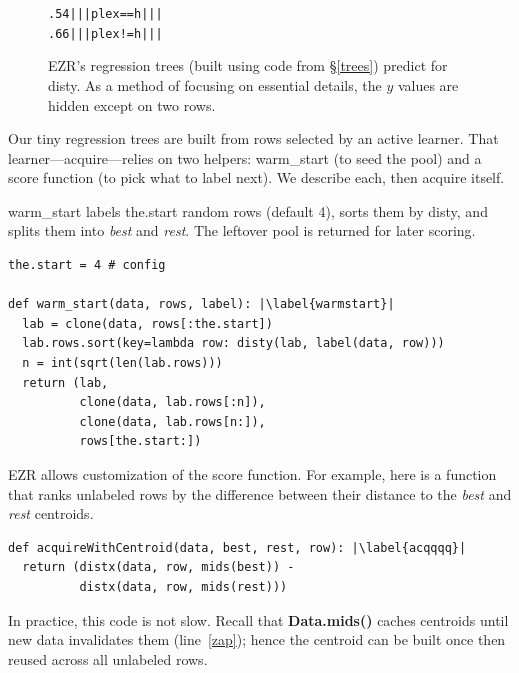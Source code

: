 \documentclass[AMA,STIX2COL]{WileyNJDv5}
\newcommand{\cls}[1]{%
  \setlength{\fboxsep}{1.5pt}%
  \colorbox{clsbg}{\sffamily\bfseries{#1}}%
}
\begin{document}
{\begin{figure}[!t]
{\begin{alltt}
.54    |  |  |  plex == h          |          |         |
.66    |  |  |  plex != h          |          |         |
\end{alltt}
}
\caption{EZR's regression trees (built using
code from \S\ref{trees}) predict for  \textsf{disty}.
As a method of focusing on essential details, the  $y$ values
are hidden except on two rows.}\label{htree}
\end{figure}
Our tiny regression trees are built from rows selected by an active 
learner. That learner---\textsf{acquire}---relies on two helpers: 
\textsf{warm\_start} (to seed the pool) and a \textsf{score} function 
(to pick what to label next). We describe each, then \textsf{acquire} 
itself.

\textsf{warm\_start} labels \textsf{the.start} random rows 
(default 4), sorts them by \textsf{disty}, and splits them into 
\textit{best} and \textit{rest}. The leftover pool is returned for 
later scoring.
\begin{verbatim}
the.start = 4 # config

def warm_start(data, rows, label): |\label{warmstart}|
  lab = clone(data, rows[:the.start])
  lab.rows.sort(key=lambda row: disty(lab, label(data, row)))
  n = int(sqrt(len(lab.rows)))
  return (lab, 
          clone(data, lab.rows[:n]),
          clone(data, lab.rows[n:]),
          rows[the.start:])
\end{verbatim}
EZR allows  customization of the 
\textsf{score} function. For example,
here is a function that ranks unlabeled rows by the difference between their 
distance to the \textit{best} and \textit{rest} centroids. 
\begin{verbatim}
def acquireWithCentroid(data, best, rest, row): |\label{acqqqq}|
  return (distx(data, row, mids(best)) -
          distx(data, row, mids(rest)))
\end{verbatim}
In practice, this code is not slow. Recall that 
\cls{Data.mids()} caches centroids until new data invalidates them 
(line~\ref{zap}); hence the centroid
can be  built once  then reused across all unlabeled rows.

}
\end{document}
